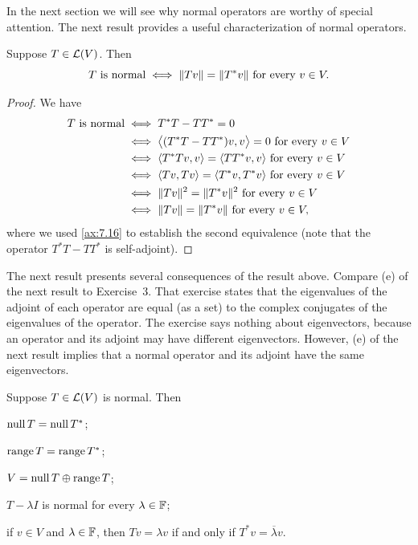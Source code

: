 In the next section we will see why normal operators are worthy of special
attention. The next result provides a useful characterization of normal
operators.

\begin{result}\label{ax:7.20}
Suppose $T\in\mathcal{L}(V)$. Then
\[ T \text{ is normal} \iff \lVert Tv \rVert=\lVert T^*v \rVert \text{ for every } v\in V. \]
\end{result}

\begin{proof}
We have
\begin{align*}
T \text{ is normal} &\iff T^*T-TT^*=0\\
  &\iff \bigl\langle (T^*T-TT^*)v,v\bigr\rangle=0 \text{ for every } v\in V\\
  &\iff \langle T^*Tv, v \rangle=\langle TT^*v, v \rangle \text{ for every } v\in V\\
  &\iff \langle Tv, Tv \rangle=\langle T^*v, T^*v \rangle \text{ for every } v\in V\\
  &\iff \lVert Tv \rVert^2=\lVert T^*v \rVert^2 \text{ for every } v\in V\\
  &\iff \lVert Tv \rVert=\lVert T^*v \rVert \text{ for every } v\in V,
\end{align*}
where we used \ref{ax:7.16} to establish the second equivalence (note that the
operator $T^*T-TT^*$ is self-adjoint).
\end{proof}

The next result presents several consequences of the result above. Compare (e)
of the next result to Exercise~3. That exercise states that the eigenvalues of
the adjoint of each operator are equal (as a set) to the complex conjugates of
the eigenvalues of the operator. The exercise says nothing about eigenvectors,
because an operator and its adjoint may have different eigenvectors. However,
(e) of the next result implies that a normal operator and its adjoint have the
same eigenvectors.

\begin{result}%
\label{ax:7.21}
Suppose $T\in\mathcal{L}(V)$ is normal. Then
\begin{parts}
\item $\operatorname{null} T=\operatorname{null} T^*$;
\item $\operatorname{range} T=\operatorname{range} T^*$;
\item $V=\operatorname{null} T\oplus\operatorname{range} T$;
\item $T-\lambda I$ is normal for every $\lambda\in\mathbb{F}$;
\item if $v\in V$ and $\lambda\in\mathbb{F}$, then $Tv=\lambda v$ if and only if
  $T^*v=\overline{\lambda}v$.
\end{parts}
\end{result}

